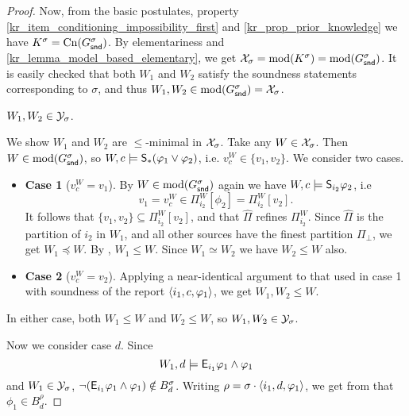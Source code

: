 \begin{proof}
    Now, from the basic postulates, property
    \cref{kr_item_conditioning_impossibility_first} and
    \cref{kr_prop_prior_knowledge} we have $K^\sigma = \cn(G^\sigma_\snd)$. By
    elementariness and \cref{kr_lemma_model_based_elementary}, we get
    $\X_\sigma = \mods(K^\sigma) = \mods(G^\sigma_\snd)$. It is easily checked
    that both $W_1$ and $W_2$ satisfy the soundness statements corresponding to
    $\sigma$, and thus $W_1, W_2 \in \mods(G^\sigma_\snd) = \X_\sigma$.

        \begin{claim}
            \label{kr_claim_w1_w2_in_ysigm}
            $W_1, W_2 \in \Y_\sigma$.
        \end{claim}
        \begin{claimproof}
            We show $W_1$ and $W_2$ are $\le$-minimal in $\X_\sigma$. Take any
            $W \in \X_\sigma$. Then $W \in \mods(G^\sigma_\snd)$, so $W, c
            \models \S_\ast(\phi_1 \lor \phi_2)$, i.e. $v^W_c \in \{v_1, v_2\}$.
            We consider two cases.
            \begin{itemize}
                \item \textbf{Case 1} ($v^W_c = v_1$). By $W \in
                    \mods(G^\sigma_\snd)$ again we have $W, c \models
                    \S_{i_2}{\phi_2}$, i.e
                    \[
                        v_1
                        = v^W_c
                        \in \Pi^W_{i_2}[\phi_2]
                        = \Pi^W_{i_2}[v_2].
                    \]
                    It follows that $\{v_1, v_2\} \subseteq \Pi^W_{i_2}[v_2]$,
                    and that $\widehat{\Pi}$ refines $\Pi^W_{i_2}$. Since
                    $\widehat{\Pi}$ is the partition of $i_2$ in $W_1$, and all
                    other sources have the finest partition $\Pi_\bot$, we get
                    $W_1 \preceq W$. By , $W_1 \le W$. Since $W_1
                    \simeq W_2$ we have $W_2 \le W$ also.

                \item \textbf{Case 2} ($v^W_c = v_2$). Applying a near-identical
                      argument to that used in case 1 with soundness of the
                      report $\tuple{i_1, c, \phi_1}$, we get $W_1, W_2 \le W$.
            \end{itemize}
            In either case, both $W_1 \le W$ and $W_2 \le W$, so $W_1, W_2 \in
            \Y_\sigma$.
        \end{claimproof}

    Now we consider case $d$. Since
    \[
        W_1, d \models \E_{i_1}{\phi_1} \land \phi_1
    \]
    and $W_1 \in \Y_\sigma$, $\neg(\E_{i_1}{\phi_1} \land \phi_1) \notin
    B^\sigma_d$. Writing $\rho = \sigma \concat \tuple{i_1, d, \phi_1}$, we get
    from \strongcondsucc{} that $\phi_1 \in B^\rho_d$.


\end{proof}
